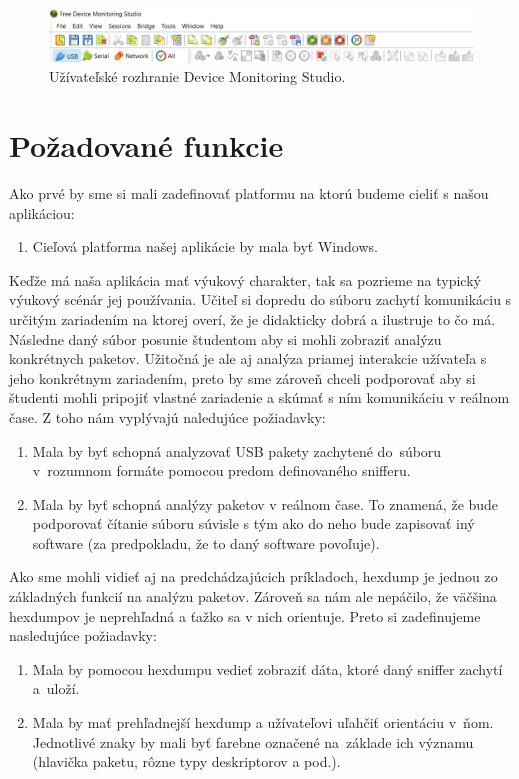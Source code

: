 \begin{figure}[!htb]
	\centering
	\includegraphics[width=\textwidth]{img/uvod_hhd_interface}
	\caption{Užívateľské rozhranie Device Monitoring Studio.}
	\label{obr:uvod:hhd_interface}
\end{figure}


\section{Požadované funkcie}

Ako prvé by sme si mali zadefinovať platformu na ktorú budeme cieliť s našou aplikáciou:
\begin{enumerate}[label=\textbf{P\arabic*}]
	\item \label{uvod:poz:platforma} Cieľová platforma našej aplikácie by mala byť Windows. 
\end{enumerate}

Keďže má naša aplikácia mať výukový charakter, tak sa pozrieme na typický výukový scénár jej používania. Učiteľ si dopredu do súboru zachytí komunikáciu s určitým zariadením na ktorej overí, že je didakticky dobrá a ilustruje to čo má. Následne daný súbor posunie študentom aby si mohli zobraziť analýzu konkrétnych paketov. Užitočná je ale aj analýza priamej interakcie užívateľa s jeho konkrétnym zariadením, preto by sme zároveň chceli podporovať aby si študenti mohli pripojiť vlastné zariadenie a skúmať s ním komunikáciu v reálnom čase. Z toho nám vyplývajú naledujúce požiadavky:
\begin{enumerate}[label=\textbf{P\arabic*},resume]
	\item \label{uvod:poz:analyza} Mala by byť schopná analyzovať USB pakety zachytené do~súboru v~rozumnom formáte pomocou predom definovaného snifferu.
	\item \label{uvod:poz:analyza_real_time} Mala by byť schopná analýzy paketov v reálnom čase. To znamená, že bude podporovať čítanie súboru súvisle s tým ako do neho bude zapisovať iný software (za predpokladu, že to daný software povoľuje).
\end{enumerate}

Ako sme mohli vidieť aj na predchádzajúcich príkladoch, hexdump je jednou zo základných funkcií na analýzu paketov. Zároveň sa nám ale nepáčilo, že väčšina hexdumpov je neprehľadná a ťažko sa v nich orientuje. Preto si zadefinujeme nasledujúce požiadavky:
\begin{enumerate}[label=\textbf{P\arabic*},resume]
	\item \label{uvod:poz:hexdump} Mala by pomocou hexdumpu vedieť zobraziť dáta, ktoré daný sniffer zachytí a~uloží.
	\item \label{uvod:poz:data_highlight} Mala by mať prehľadnejší hexdump a užívateľovi uľahčiť orientáciu v~ňom. Jednotlivé znaky by mali byť farebne označené na~základe ich významu (hlavička paketu, rôzne typy deskriptorov a pod.).
\end{enumerate}

